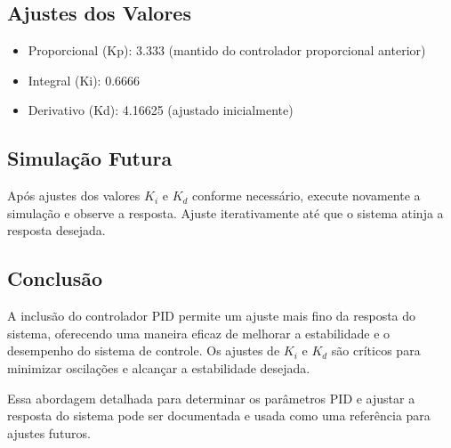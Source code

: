 \subsection{Ajustes dos Valores}

\begin{itemize}
    \item Proporcional (Kp): 3.333 (mantido do controlador proporcional anterior)
    \item Integral (Ki): 0.6666
    \item Derivativo (Kd): 4.16625 (ajustado inicialmente)
\end{itemize}

\subsection{Simulação Futura}
Após ajustes dos valores \( K_i \) e \( K_d \) conforme necessário, execute novamente a simulação e observe a resposta. Ajuste iterativamente até que o sistema atinja a resposta desejada.

\subsection{Conclusão}
A inclusão do controlador PID permite um ajuste mais fino da resposta do sistema, oferecendo uma maneira eficaz de melhorar a estabilidade e o desempenho do sistema de controle. Os ajustes de \( K_i \) e \( K_d \) são críticos para minimizar oscilações e alcançar a estabilidade desejada.

Essa abordagem detalhada para determinar os parâmetros PID e ajustar a resposta do sistema pode ser documentada e usada como uma referência para ajustes futuros.
